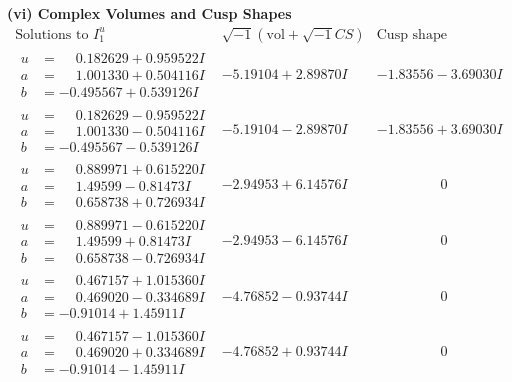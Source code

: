 \documentclass[1p]{elsarticle_modified}
\theoremstyle{definition}
\newcommand{\I}{\sqrt{-1}}
\begin{document}
\newpage\flushleft \textbf{(vi) Complex Volumes and Cusp Shapes}
$$\begin{array}{c|c|c}  
\text{Solutions to }I^u_{1}& \I (\text{vol} + \sqrt{-1}CS) & \text{Cusp shape}\\
 \hline 
\begin{aligned}
u &= \phantom{-}0.182629 + 0.959522 I \\
a &= \phantom{-}1.001330 + 0.504116 I \\
b &= -0.495567 + 0.539126 I\end{aligned}
 & -5.19104 + 2.89870 I & -1.83556 - 3.69030 I \\ \hline\begin{aligned}
u &= \phantom{-}0.182629 - 0.959522 I \\
a &= \phantom{-}1.001330 - 0.504116 I \\
b &= -0.495567 - 0.539126 I\end{aligned}
 & -5.19104 - 2.89870 I & -1.83556 + 3.69030 I \\ \hline\begin{aligned}
u &= \phantom{-}0.889971 + 0.615220 I \\
a &= \phantom{-}1.49599 - 0.81473 I \\
b &= \phantom{-}0.658738 + 0.726934 I\end{aligned}
 & -2.94953 + 6.14576 I & \phantom{-0.000000 } 0 \\ \hline\begin{aligned}
u &= \phantom{-}0.889971 - 0.615220 I \\
a &= \phantom{-}1.49599 + 0.81473 I \\
b &= \phantom{-}0.658738 - 0.726934 I\end{aligned}
 & -2.94953 - 6.14576 I & \phantom{-0.000000 } 0 \\ \hline\begin{aligned}
u &= \phantom{-}0.467157 + 1.015360 I \\
a &= \phantom{-}0.469020 - 0.334689 I \\
b &= -0.91014 + 1.45911 I\end{aligned}
 & -4.76852 - 0.93744 I & \phantom{-0.000000 } 0 \\ \hline\begin{aligned}
u &= \phantom{-}0.467157 - 1.015360 I \\
a &= \phantom{-}0.469020 + 0.334689 I \\
b &= -0.91014 - 1.45911 I\end{aligned}
 & -4.76852 + 0.93744 I & \phantom{-0.000000 } 0 \\ \hline\begin{aligned}

\end{aligned}
\end{array}$$
\end{document}
